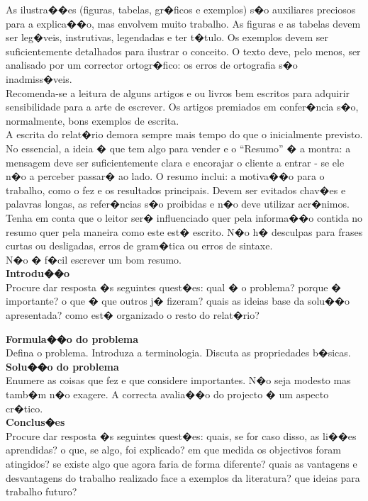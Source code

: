 As ilustra��es (figuras, tabelas, gr�ficos e exemplos) s�o auxiliares preciosos para a explica��o, mas envolvem muito trabalho. As figuras e as tabelas devem ser leg�veis, instrutivas, legendadas e ter t�tulo. Os exemplos devem ser suficientemente detalhados para ilustrar o conceito.
O texto deve, pelo menos, ser analisado por um corrector ortogr�fico: os erros de ortografia s�o inadmiss�veis.\\

Recomenda-se a leitura de alguns artigos e ou livros bem escritos para adquirir sensibilidade para a arte de escrever. Os artigos premiados em confer�ncia s�o, normalmente, bons exemplos de escrita.\\

A escrita do relat�rio demora sempre mais tempo do que o inicialmente previsto.\\

No essencial, a ideia � que tem algo para vender e o ``Resumo'' � a montra: a mensagem deve ser suficientemente clara e encorajar o cliente a entrar - se ele n�o a perceber passar� ao lado. O resumo inclui: a motiva��o para o trabalho, como o fez e os resultados principais. Devem ser evitados chav�es e palavras longas, as refer�ncias s�o proibidas e n�o deve utilizar acr�nimos. Tenha em conta que o leitor ser� influenciado quer pela informa��o contida no resumo quer pela maneira como este est� escrito. N�o h� desculpas para frases curtas ou desligadas, erros de gram�tica ou erros de sintaxe.\\

N�o � f�cil escrever um bom resumo.\\

\textbf{Introdu��o}\\
Procure dar resposta �s seguintes quest�es: qual � o problema? porque � importante? o que � que outros j� fizeram? quais as ideias base da solu��o apresentada? como est� organizado o resto do relat�rio?

\textbf{Formula��o do problema}\\
Defina o problema. Introduza a terminologia. Discuta as propriedades b�sicas.\\

\textbf{Solu��o do problema}\\
Enumere as coisas que fez e que considere importantes. N�o seja modesto mas tamb�m n�o exagere.
A correcta avalia��o do projecto � um aspecto cr�tico.\\

\textbf{Conclus�es}\\
Procure dar resposta �s seguintes quest�es: quais, se for caso disso, as li��es aprendidas? o que, se algo, foi explicado? em que medida os objectivos foram atingidos? se existe algo que agora faria de forma diferente? quais as vantagens e desvantagens do trabalho realizado face a exemplos da literatura? que ideias para trabalho futuro?\\

